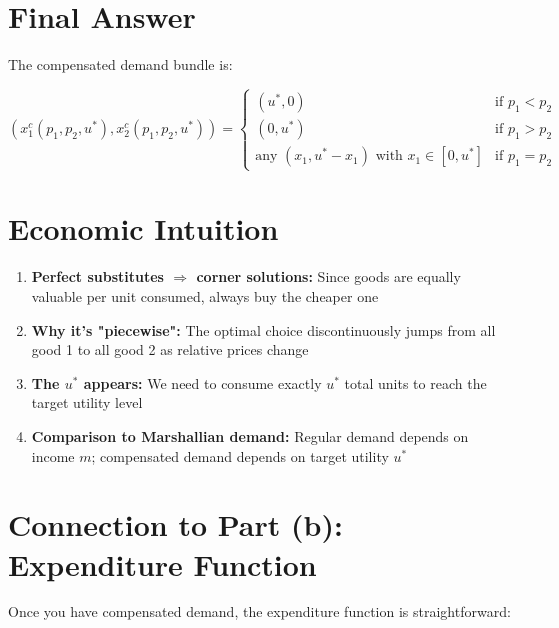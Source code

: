 \documentclass[11pt]{article}
\begin{document}
\section{Final Answer}

The compensated demand bundle is:

\begin{tcolorbox}[colback=yellow!10!white,colframe=orange!75!black,title=Compensated Demand for Perfect Substitutes]
\begin{equation}
(x_1^c(p_1, p_2, u^*), x_2^c(p_1, p_2, u^*)) =
\begin{cases}
(u^*, 0) & \text{if } p_1 < p_2 \\
(0, u^*) & \text{if } p_1 > p_2 \\
\text{any } (x_1, u^* - x_1) \text{ with } x_1 \in [0, u^*] & \text{if } p_1 = p_2
\end{cases}
\end{equation}
\end{tcolorbox}

\section{Economic Intuition}

\begin{enumerate}[leftmargin=*]
\item \textbf{Perfect substitutes $\Rightarrow$ corner solutions:} Since goods are equally valuable per unit consumed, always buy the cheaper one

\item \textbf{Why it's "piecewise":} The optimal choice discontinuously jumps from all good 1 to all good 2 as relative prices change

\item \textbf{The $u^*$ appears:} We need to consume exactly $u^*$ total units to reach the target utility level

\item \textbf{Comparison to Marshallian demand:} Regular demand depends on income $m$; compensated demand depends on target utility $u^*$
\end{enumerate}

\section{Connection to Part (b): Expenditure Function}

Once you have compensated demand, the expenditure function is straightforward:
\end{document}
